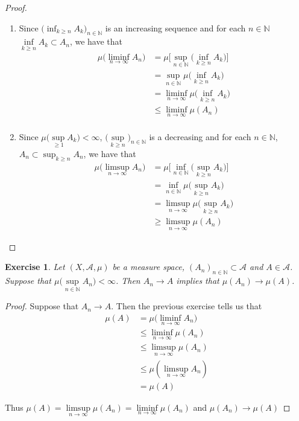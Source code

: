 \documentclass[12pt]{amsart}
\newtheorem{ex}[thm]{Exercise}
\newcommand{\N}{\mathbb{N}}
\newcommand{\MA}{\mathcal{A}}
\begin{document}
	\begin{proof}\
		\begin{enumerate}
			\item Since $\bigg(\inf_{k \geq n}A_k \bigg)_{n \in \N}$ is an increasing sequence and for each $n \in \N$ $\inf\limits_{k \geq n}A_k \subset A_n$, we have that
			\begin{align*}
				\mu\bigg(\liminf\limits_{n \rightarrow \infty} A_n \bigg) 
				& = \mu \bigg[\sup_{n \in \N} \bigg(\inf\limits_{k \geq n} A_k \bigg) \bigg] \\
				&= \sup_{n \in \N}  \mu\bigg( \inf_{k \geq n}A_k\bigg)\\
				& = \liminf_{n \rightarrow \infty} \mu\bigg( \inf_{k \geq n}A_k\bigg) \\
				& \leq \liminf_{n \rightarrow \infty}  \mu(A_n) \\
			\end{align*}
			\item Since $\mu\bigg(\sup\limits_{ \geq 1}A_k \bigg) < \infty$, $\bigg(\sup\limits_{k \geq n} \bigg)_{n \in \N}$ is a decreasing and for each $n \in \N$, $A_n \subset \sup_{k \geq n}A_n$, we have that 
			\begin{align*}
				\mu \bigg(\limsup_{n \rightarrow \infty} A_n 
				\bigg) 
				&= \mu \bigg[\inf_{n \in \N} \bigg(\sup_{k  \geq n} A_k \bigg) \bigg] \\
				&= \inf_{n \in \N}\mu\bigg( \sup_{k \geq n} A_k\bigg) \\
				& = \limsup_{n \rightarrow \infty} \mu \bigg( \sup_{k \geq n}A_k \bigg) \\
				& \geq \limsup_{n \rightarrow \infty} \mu ( A_n )\
			\end{align*} 
		\end{enumerate}
	\end{proof}
	
	\begin{ex}
		Let $(X, \MA, \mu)$ be a measure space, $(A_n)_{n \in \N} \subset \MA$ and $A \in \MA$. Suppose that $\mu\bigg(\sup\limits_{n \in \N}A_n\bigg) < \infty$. Then $A_n \rightarrow A$ implies that $\mu(A_n) \rightarrow \mu(A)$. 
	\end{ex} 
	
	\begin{proof}
		Suppose that $A_n \rightarrow A$. Then the previous exercise tells us that 
		\begin{align*}
			\mu(A)
			&= \mu\bigg(\liminf\limits_{n \rightarrow \infty}A_n \bigg)\\
			& \leq \liminf_{n \rightarrow \infty} \mu(A_n)\\
			& \leq \limsup_{n \rightarrow \infty}\mu (A_n) \\
			& \leq \mu( \limsup_{n \rightarrow \infty} A_n) \\
			&= \mu (A)
		\end{align*}
		
		Thus $\mu(A) = \limsup\limits_{n \rightarrow \infty}\mu(A_n) = \liminf\limits_{n \rightarrow \infty}\mu(A_n)$ and $\mu(A_n) \rightarrow \mu(A)$
	\end{proof}
	
\end{document}
